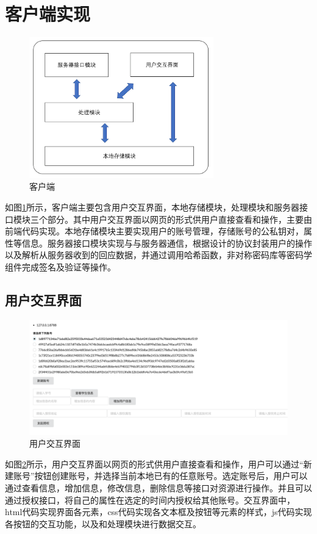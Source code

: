 \section{客户端实现}

\begin{figure}[htb]
\centering
\includegraphics[width=8cm, keepaspectratio]{figures/client.png}
\caption{客户端}
\label{fig:client}
\end{figure}

如图\ref{fig:client}所示，客户端主要包含用户交互界面，本地存储模块，处理模块和服务器接口模块三个部分。其中用户交互界面以网页的形式供用户直接查看和操作，主要由前端代码实现。本地存储模块主要实现用户的账号管理，存储账号的公私钥对，属性等信息。服务器接口模块实现与与服务器通信，根据设计的协议封装用户的操作以及解析从服务器收到的回应数据，并通过调用哈希函数，非对称密码库等密码学组件完成签名及验证等操作。

\subsection{用户交互界面}

\begin{figure}[h]
\centering
\includegraphics[width=12cm, keepaspectratio]{figures/ui.png}
\caption{用户交互界面}
\label{fig:ui}
\end{figure}

如图\ref{fig:ui}所示，用户交互界面以网页的形式供用户直接查看和操作，用户可以通过“新建账号”按钮创建账号，并选择当前本地已有的任意账号。选定账号后，用户可以通过查看信息，增加信息，修改信息，删除信息等接口对资源进行操作。并且可以通过授权接口，将自己的属性在选定的时间内授权给其他账号。交互界面中，html代码实现界面各元素，css代码实现各文本框及按钮等元素的样式，js代码实现各按钮的交互功能，以及和处理模块进行数据交互。


